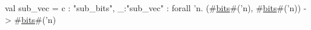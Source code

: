 val sub_vec = {c : "sub_bits", _:"sub_vec"} : forall 'n. (#\hyperref[zbits]{bits}#('n), #\hyperref[zbits]{bits}#('n)) -> #\hyperref[zbits]{bits}#('n)
